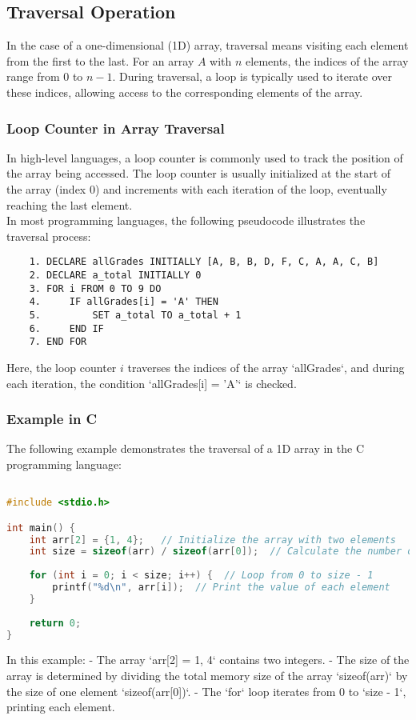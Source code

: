 \documentclass[12pt, oneside]{book}
\begin{document}
\subsection{Traversal Operation}

In the case of a one-dimensional (1D) array, traversal means visiting each element from the first to the last. For an array \( A \) with \( n \) elements, the indices of the array range from 0 to \( n - 1 \). During traversal, a loop is typically used to iterate over these indices, allowing access to the corresponding elements of the array.

\subsubsection{Loop Counter in Array Traversal} 
In high-level languages, a loop counter is commonly used to track the position of the array being accessed. The loop counter is usually initialized at the start of the array (index 0) and increments with each iteration of the loop, eventually reaching the last element.\\
In most programming languages, the following pseudocode illustrates the traversal process:

\begin{verbatim}
	1. DECLARE allGrades INITIALLY [A, B, B, D, F, C, A, A, C, B]
	2. DECLARE a_total INITIALLY 0
	3. FOR i FROM 0 TO 9 DO
	4.     IF allGrades[i] = 'A' THEN
	5.         SET a_total TO a_total + 1
	6.     END IF
	7. END FOR
\end{verbatim}
Here, the loop counter \( i \) traverses the indices of the array `allGrades`, and during each iteration, the condition `allGrades[i] = 'A'` is checked.

\subsubsection{Example in C}

The following example demonstrates the traversal of a 1D array in the C programming language:

\begin{lstlisting}[language=C, caption={Example C Code}]

#include <stdio.h>

int main() {
	int arr[2] = {1, 4};   // Initialize the array with two elements
	int size = sizeof(arr) / sizeof(arr[0]);  // Calculate the number of elements in the array
	
	for (int i = 0; i < size; i++) {  // Loop from 0 to size - 1
		printf("%d\n", arr[i]);  // Print the value of each element
	}
	
	return 0;
}
\end{lstlisting}
In this example:
- The array `arr[2] = {1, 4}` contains two integers.
- The size of the array is determined by dividing the total memory size of the array `sizeof(arr)` by the size of one element `sizeof(arr[0])`.
- The `for` loop iterates from 0 to `size - 1`, printing each element.
\end{document}
